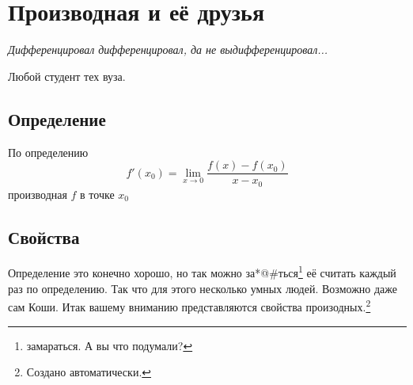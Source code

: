 \chapter{Производная {\scriptsize и её друзья}}
\epigraph{\textit{Дифференцировал дифференцировал, да не выдифференцировал...}}{Любой студент тех вуза.}
\section{Определение}
По определению
\begin{equation}
	f'(x_0) = \lim\limits_{x\rightarrow0}{\frac{f(x) - f(x_0)}{x - x_0}}
\end{equation}
производная $ f $ в точке $ x_0 $
\section{Свойства}
\label{DerTable}
Определение это конечно хорошо, но так можно за*@\#ться\footnote{замараться. А вы что подумали?} её считать каждый раз по определению. Так что для этого несколько умных людей. Возможно даже сам Коши\cite{Koshi}. Итак вашему вниманию представляются свойства произодных.\footnote{Создано автоматически.}
